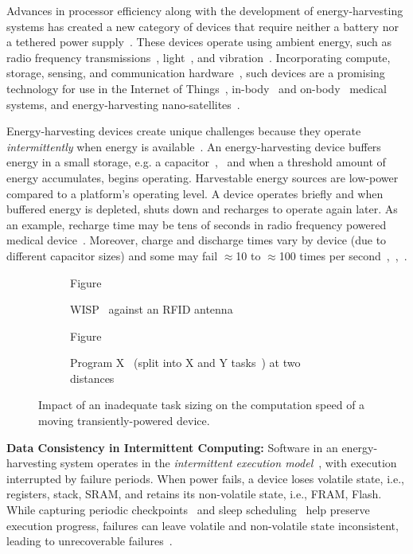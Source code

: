 Advances in processor efficiency along with the development of energy-harvesting systems has created a new category of devices that require neither a battery nor a tethered power supply~\cite{prasad_comst_2014,lucia_snapl_2017,soyata_csm_2016}. These devices operate using ambient energy, such as radio frequency transmissions~\cite{rf_powered_computing_gollakota_2014}, light~\cite{margolies_infocom_2016,margolies_tosn_2016}, and vibration~\cite{gorlatova_sigmetrics_2014}. Incorporating compute, storage, sensing, and communication hardware~\cite{wisp5,moo}, such devices are a promising technology for use in the Internet of Things~\cite{ku_cst_2016}, in-body~\cite{nadeau_naturebio_2017} and on-body~\cite{bandodkar_electroanalysis_2015} medical systems, and energy-harvesting nano-satellites~\cite{kicksat}.

Energy-harvesting devices create unique challenges because they operate {\em intermittently} when energy is available~\cite{hicks_isca_2017,lucia_snapl_2017}. An
energy-harvesting device buffers energy in a small storage, e.g. a capacitor~\cite{gorlatova_tmc_2013},~\cite{gunduz_commag_2014} and when a threshold amount of energy accumulates, begins operating. Harvestable energy sources are low-power compared to a platform's operating level. A device operates briefly and when buffered energy is depleted, shuts down and recharges to operate again later. As an example, recharge time may be tens of seconds in radio frequency powered medical device~\cite[Fig. 3c]{nadeau_naturebio_2017}. Moreover, charge and discharge times vary by device (due to different capacitor sizes) and some may fail $\approx$10 to $\approx$100 times per second~\cite{tan_infocom_2016},~\cite{mementos},~\cite{nvp}.

\begin{figure}
	\begin{subfigure}[t]{.35\linewidth}
		\centering\large Figure
		\caption{\centering WISP~\cite{wisp} against an RFID antenna}\label{fig:1a}
	\end{subfigure}%
	\begin{subfigure}[t]{.65\linewidth}
		\centering\large Figure
		\caption{\centering Program X~\cite{hicks_mibench2_2016} (split into X and Y tasks~\cite{chain}) at two distances}\label{fig:1b}
    \end{subfigure}
	\caption{Impact of an inadequate task sizing on the computation speed of a moving transiently-powered device.}\label{fig:1}
\end{figure}

\textbf{Data Consistency in Intermittent Computing:} Software in an energy-harvesting system operates in the {\em intermittent execution model}~\cite{dino,lucia_snapl_2017}, with execution interrupted by failure periods. When power fails, a device loses volatile state, i.e., registers, stack, SRAM, and retains its non-volatile state, i.e., FRAM, Flash. While capturing periodic checkpoints~\cite{mementos,quickrecall} and sleep scheduling~\cite{dewdrop,hibernus,hibernusplusplus} help preserve execution progress, failures can leave volatile and non-volatile state inconsistent, leading to unrecoverable failures~\cite{dino,edb}. 

